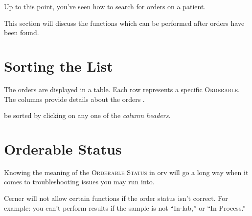 Up to this point, you've seen how to search for orders on a patient.

This section will discuss the functions which can be performed after orders have been found.\\


\section{Sorting the List}
The orders are displayed in a table. Each row represents a specific \textsc{Orderable}. The columns provide details about the orders .

 be sorted by clicking on any one of the \textit{column headers}.\\

\noindent
{}%
\clearpage

\vfill
{}

\section{Orderable Status\label{sec:orderable_status}}

\noindent
Knowing the meaning of the \textsc{Orderable Status} in \gls{orv} will go a long way when it comes to troubleshooting issues you may run into.

Cerner will not allow certain functions if the order status isn't correct. For example: you can't \gls{perform} results if the sample is not ``In-lab,'' or ``In Process.''

